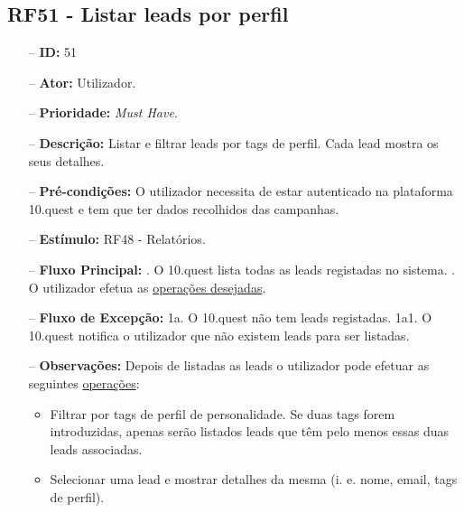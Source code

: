 \subsection{RF51 - Listar leads por perfil}
\begin{itemize}
	\item[--] \textbf{ID:} 51
	\item[--]  \textbf{Ator:} Utilizador.
	\item[--]  \textbf{Prioridade:} \textit{Must Have}.
	\item[--]  \textbf{Descrição:} Listar e filtrar leads por tags de perfil. Cada lead mostra os seus detalhes.
	\item[--]  \textbf{Pré-condições:} O utilizador necessita de estar autenticado na plataforma 10.quest e tem que ter dados recolhidos das campanhas.
	\item[--]  \textbf{Estímulo:} RF48 - Relatórios.
	\item[--]  \textbf{Fluxo Principal:} 
	. O 10.quest lista todas as leads registadas no sistema.
	. O utilizador efetua as \underline{operações desejadas}.
	\item[--]  \textbf{Fluxo de Excepção:} 
	\subitem 1a. O 10.quest não tem leads registadas.
	\subitem 1a1. O 10.quest notifica o utilizador que não existem leads para ser listadas.
	\item[--]  \textbf{Observações:} Depois de listadas as leads o utilizador pode efetuar as seguintes \underline{operações}:
	\begin{itemize}
		\item Filtrar por tags de perfil de personalidade. Se duas tags forem introduzidas, apenas serão listados leads que têm pelo menos essas duas leads associadas.
		\item Selecionar uma lead e mostrar detalhes da mesma (i. e. nome, email, tags de perfil).
	\end{itemize}
\end{itemize}
\newpage

